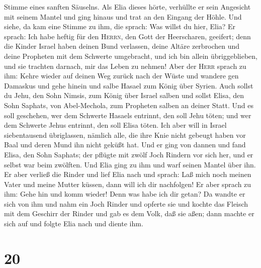 Stimme eines sanften Säuselns.  Als Elia dieses hörte,
verhüllte er sein Angesicht mit seinem Mantel und ging hinaus und trat
an den Eingang der Höhle. Und siehe, da kam eine Stimme zu ihm, die
sprach: Was willst du hier, Elia?  Er sprach: Ich habe
heftig für den \textsc{Herrn}, den Gott der Heerscharen, geeifert; denn
die Kinder Israel haben deinen Bund verlassen, deine Altäre zerbrochen
und deine Propheten mit dem Schwerte umgebracht, und ich bin allein
übriggeblieben, und sie trachten darnach, mir das Leben zu nehmen!
 Aber der \textsc{Herr} sprach zu ihm: Kehre wieder auf
deinen Weg zurück nach der Wüste und wandere gen Damaskus und gehe
hinein und salbe Hasael zum König über Syrien.  Auch
sollst du Jehu, den Sohn Nimsis, zum König über Israel salben und sollst
Elisa, den Sohn Saphats, von Abel-Mechola, zum Propheten salben an
deiner Statt.  Und es soll geschehen, wer dem Schwerte
Hasaels entrinnt, den soll Jehu töten; und wer dem Schwerte Jehus
entrinnt, den soll Elisa töten.  Ich aber will in Israel
siebentausend übriglassen, nämlich alle, die ihre Knie nicht gebeugt
haben vor Baal und deren Mund ihn nicht geküßt hat.  Und
er ging von dannen und fand Elisa, den Sohn Saphats; der pflügte mit
zwölf Joch Rindern vor sich her, und er selbst war beim zwölften. Und
Elia ging zu ihm und warf seinen Mantel über ihn.  Er
aber verließ die Rinder und lief Elia nach und sprach: Laß mich noch
meinen Vater und meine Mutter küssen, dann will ich dir nachfolgen! Er
aber sprach zu ihm: Gehe hin und komm wieder!  Denn was
habe ich dir getan? Da wandte er sich von ihm und nahm ein Joch Rinder
und opferte sie und kochte das Fleisch mit dem Geschirr der Rinder und
gab es dem Volk, daß sie aßen; dann machte er sich auf und folgte Elia
nach und diente ihm.

\hypertarget{section-19}{%
\section{20}\label{section-19}}

